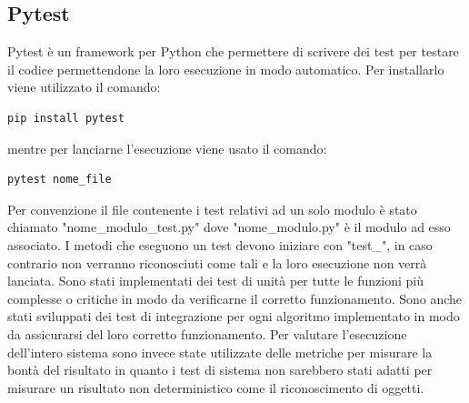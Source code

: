 \subsection{Pytest}
Pytest è un framework per Python che permettere di scrivere dei test per testare il codice permettendone la loro esecuzione in modo automatico. Per installarlo viene utilizzato il comando:
\begin{verbatim}
pip install pytest
\end{verbatim}
mentre per lanciarne l'esecuzione viene usato il comando:
\begin{verbatim}
pytest nome_file
\end{verbatim}
Per convenzione il file contenente i test relativi ad un solo modulo è stato chiamato "nome\_modulo\_test.py" dove "nome\_modulo.py" è il modulo ad esso associato. I metodi che eseguono un test devono iniziare con "test\_", in caso contrario non verranno riconosciuti come tali e la loro esecuzione non verrà lanciata. Sono stati implementati dei test di unità per tutte le funzioni più complesse o critiche in modo da verificarne il corretto funzionamento. Sono anche stati sviluppati dei test di integrazione per ogni algoritmo implementato in modo da assicurarsi del loro corretto funzionamento. Per valutare l'esecuzione dell'intero sistema sono invece state utilizzate delle metriche per misurare la bontà del risultato in quanto i test di sistema non sarebbero stati adatti per misurare un risultato non deterministico come il riconoscimento di oggetti.
